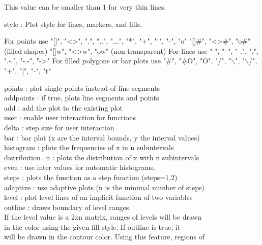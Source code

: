 \documentclass[a4paper,10pt]{article}
\begin{document}
\begin{eulernotebook}
\begin{eulercomment}
\begin{eulercomment}
\begin{eulercomment}
\begin{eulercomment}
\begin{eulerttcomment}
            This value can be smaller than 1 for very thin lines.
\end{eulerttcomment}
\begin{eulercomment}
style     : Plot style for lines, markers, and fills.\\
\end{eulercomment}
\begin{eulerttcomment}
            For points use
            "[]", "<>", ".", "..", "...",
            "*", "+", "|", "-", "o"
            "[]#", "<>#", "o#" (filled shapes)
            "[]w", "<>w", "ow" (non-transparent)
            For lines use
            "-", "--", "-.", ".", ".-.", "-.-", "->"
            For filled polygons or bar plots use
            "#", "#O", "O", "/", "\(\backslash\)", "\(\backslash\)/",
            "+", "|", "-", "t"
\end{eulerttcomment}
\begin{eulercomment}
points    : plot single points instead of line segments\\
addpoints : if true, plots line segments and points\\
add       : add the plot to the existing plot\\
user      : enable user interaction for functions\\
delta     : step size for user interaction\\
bar       : bar plot (x are the interval bounds, y the interval values)\\
histogram : plots the frequencies of x in n subintervals\\
distribution=n : plots the distribution of x with n subintervals\\
even      : use inter values for automatic histograms.\\
steps     : plots the function as a step function (steps=1,2)\\
adaptive  : use adaptive plots (n is the minimal number of steps)\\
level     : plot level lines of an implicit function of two variables\\
outline   : draws boundary of level ranges.
\\
If the level value is a 2xn matrix, ranges of levels will be drawn\\
in the color using the given fill style. If outline is true, it\\
will be drawn in the contour color. Using this feature, regions of\\

\end{eulercomment}
\end{eulercomment}
\end{eulercomment}
\end{eulercomment}
\end{eulercomment}
\end{eulernotebook}
\end{document}
